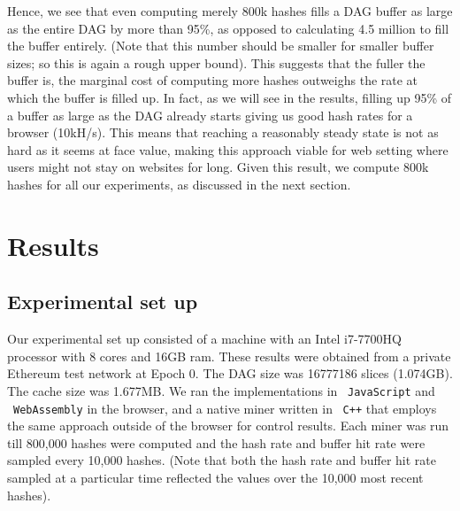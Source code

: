 \documentclass[runningheads]{llncs}
\begin{document}
Hence, we see that even computing merely 800k hashes fills a DAG buffer as large as the entire DAG by more than 95\%, as opposed to calculating 4.5 million to fill the buffer entirely. (Note that this number should be smaller for smaller buffer sizes; so this is again a rough upper bound). This suggests that the fuller the buffer is, the marginal cost of computing more hashes outweighs the rate at which the buffer is filled up. In fact, as we will see in the results, filling up 95\% of a buffer as large as the DAG already starts giving us good hash rates for a browser (10kH/s). 
This means that reaching a reasonably steady state is not as hard as it seems at face value, making this approach viable for web setting where users might not stay on websites for long. Given this result, we compute 800k hashes for all our experiments, as discussed in the next section.

\section{Results}
\subsection{Experimental set up}
Our experimental set up consisted of a machine with an Intel i7-7700HQ processor with 8 cores and 16GB ram. These results were obtained from a private Ethereum test network at Epoch 0. The DAG size was 16777186 slices (1.074GB). The cache size was 1.677MB. We ran the implementations in ~\verb|JavaScript| and ~\verb|WebAssembly| in the browser, and a native miner written in ~\verb|C++| that employs the same approach outside of the browser for control results. Each miner was run till 800,000 hashes were computed and the hash rate and buffer hit rate were sampled every 10,000 hashes. (Note that both the hash rate and buffer hit rate sampled at a particular time reflected the values over the 10,000 most recent hashes).

\end{document}
